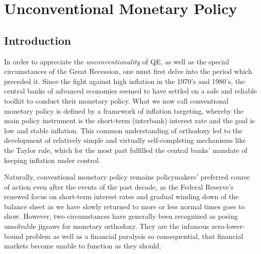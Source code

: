 \documentclass[11pt,a4paper,oneside]{book}
\begin{document}




\chapter{Unconventional Monetary Policy}

\section{Introduction}
\label{sec:Intro_Unconventional}

In order to appreciate the \textit{unconventionality} of QE, as well as the special circumstances of the Great Recession, one must first delve into the period which preceded it. Since the fight against high inflation in the 1970's and 1980's, the central banks of advanced economies seemed to have settled on a safe and reliable toolkit to conduct their monetary policy. What we now call conventional monetary policy is defined by a framework of inflation targeting, whereby the main policy instrument is the short-term (interbank) interest rate and the goal is low and stable inflation. This common understanding of orthodoxy led to the development of relatively simple and virtually self-completing mechanisms like the Taylor rule, which for the most part fulfilled the central banks' mandate of keeping inflation under control.

Naturally, conventional monetary policy remains policymakers' preferred course of action even after the events of the past decade, as the Federal Reserve's renewed focus on short-term interest rates and gradual winding down of the balance sheet as we have slowly returned to more or less normal times goes to show. However, two circumstances have generally been recognized as posing unsolvable jigsaws for monetary orthodoxy. They are the  infamous zero-lower-bound problem as well as a financial paralysis so consequential, that financial markets become unable to function as they should.
\end{document}
